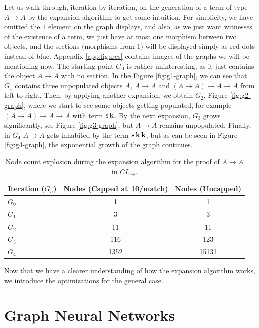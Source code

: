 Let us walk through, iteration by iteration, on the generation of a term of type $A \to A$ by the expansion algorithm to get some intuition. 
For simplicity, we have omitted the $1$ element on the graph displays, and also, as we just want witnesses of the existence of a term, we just have at most one
morphism between two objects, and the sections (morphisms from $1$) will be displayed simply as red dots instead of blue.
Appendix \ref{app:figures} contains images of the graphs we will be mentioning now.
The starting point $G_0$ is rather uninteresting, as it just contains the object $A \to A$ with no section.
In the Figure \ref{fig:g1-graph}, we can see that $G_1$ contains three unpopulated objects $A$, $A \to A$ and $(A \to A) \to A \to A$ from left to right.
Then, by applying another expansion, we obtain $G_2$, Figure \ref{fig:g2-graph}, where we start to see some objects getting populated, 
for example $(A \to A) \to A \to A$ with term $\operatorname{\mathbf{s}} \operatorname{\mathbf{k}}$. By the next expansion, $G_3$ grows significantly, see Figure \ref{fig:g3-graph}, but $A \to A$ 
remains unpopulated. Finally, in $G_4$ $A \to A$ gets inhabited by the term $\operatorname{\mathbf{s}} \operatorname{\mathbf{k}} \operatorname{\mathbf{k}}$, but as can be seen in Figure \ref{fig:g4-graph},
the exponential growth of the graph continues.

\begin{table}[htbp]
\centering
\begin{tabular}{lcc}
\toprule
\textbf{Iteration ($G_n$)} & \textbf{Nodes (Capped at 10/match)} & \textbf{Nodes (Uncapped)} \\
\midrule
$G_0$ & 1 & 1 \\
$G_1$ & 3 & 3 \\
$G_2$ & 11 & 11 \\
$G_3$ & 116 & 123 \\
$G_4$ & 1352 & 15131 \\
\bottomrule
\end{tabular}
\caption{Node count explosion during the expansion algorithm for the proof of $A \to A$ in $CL_\rightarrow$.}
\label{tab:node_explosion}
\end{table}

Now that we have a clearer understanding of how the expansion algorithm works, we introduce the 
optimizations for the general case.

\section{Graph Neural Networks}


